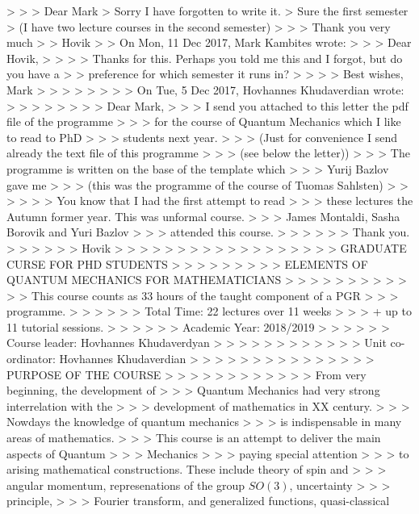  > 
 > 
 >   Dear Mark
 >   Sorry I have forgotten to write it.
 >   Sure  the  first semester
 > (I have two lecture courses in the second semester)
 > 
 > 
 >      Thank you very much
 > 
 >              Hovik
 > 
 > On Mon, 11 Dec 2017, Mark Kambites wrote:
 > 
 > > Dear Hovik,
 > >
 > > Thanks for this. Perhaps you told me this and I forgot, but do you have a
 > > preference for which semester it runs in?
 > >
 > > Best wishes, Mark
 > >
 > >
 > >
 > > On Tue, 5 Dec 2017, Hovhannes Khudaverdian wrote:
 > >
 > > >
 > > >                  Dear Mark,
 > > > I send you attached to this  letter the pdf file of the programme
 > > >  for the course of Quantum Mechanics which I like to read to PhD
 > > >   students next year.
 > > >   (Just for convenience I send already the text file of this programme
 > > > (see below the letter))
 > > >    The programme is written on the base of the template which
 > > >    Yurij Bazlov gave me
 > > > (this was the programme of the course of Tuomas Sahlsten)
 > > >
 > > >  You know that I had the first attempt to read
 > > >  these lectures the Autumn former year. This was unformal course.
 > > >    James Montaldi, Sasha Borovik and Yuri Bazlov
 > > >    attended this course.
 > > >
 > > >      Thank you.
 > > >
 > > >         Hovik
 > > >
 > > >
 > > >
 > > > %
 > > >
 > > >               GRADUATE CURSE FOR PHD STUDENTS
 > > >
 > > >
 > > > ELEMENTS OF QUANTUM MECHANICS FOR MATHEMATICIANS
 > > >
 > > >
 > > >
 > > > This course counts as 33 hours of the taught component of a PGR
 > > > programme.
 > > >
 > > >     Total Time: 22 lectures over 11 weeks
 > > >  + up to 11 tutorial sessions.
 > > >
 > > >           Academic Year: 2018/2019
 > > >
 > > > Course leader: Hovhannes Khudaverdyan
 > > >
 > > >
 > > >
 > > > Unit co-ordinator: Hovhannes Khudaverdian
 > > >
 > > >
 > > >
 > > >
 > > >                       PURPOSE OF THE COURSE
 > > >
 > > >
 > > >
 > > > From  very beginning, the development of
 > > > Quantum Mechanics  had very strong interrelation with the
 > > > development of mathematics in XX century.
 > > > Nowdays the knowledge of quantum mechanics
 > > > is indispensable in many areas of mathematics.
 > > > This course is an attempt to deliver the main aspects of  Quantum
 > > > Mechanics
 > > > paying special attention
 > > > to   arising mathematical constructions. These include theory of spin and
 > > > angular momentum, represenations of the group $SO(3)$, uncertainty
 > > > principle,
 > > > Fourier transform, and generalized functions, quasi-classical
